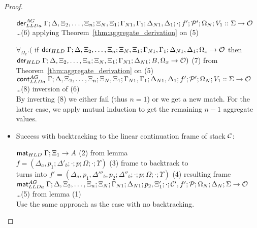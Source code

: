 \begin{proof}
\begin{itemize}[leftmargin=*]
      $\mathsf{der}_{LLDa}^{AG} \; \Gamma; \Delta, \Xi_2, \dotsc, \Xi_n; \Xi_N, \Xi_1; \Gamma_{N1}, \Gamma_1; \Delta_{N1}, \Delta_1;
            \cdot; f'; \mathcal{P'}; \Omega_N; V_1 :: \Sigma \rightarrow \mathcal{O}$
      \\ \dots \hfill (6) applying Theorem~\ref{thm:aggregate_derivation} on (5)

      $\forall_{\Omega_x}. ($ if $\mathsf{der}_{HLD} \; \Gamma; \Delta, \Xi_2, \dotsc, \Xi_n; \Xi_N, \Xi_1;
            \Gamma_{N1}, \Gamma_1; \Delta_{N1}, \Delta_1; \Omega_x \rightarrow
            \mathcal{O}$ then \\ \hspace*{0.5cm} $\mathsf{der}_{HLD} \; \Gamma;
            \Delta, \Xi_2, \dotsc, \Xi_n; \Xi_N, \Xi_1; \Gamma_{N1}; \Delta_{N1}; B, \Omega_x
            \rightarrow \mathcal{O})$ \hfill (7) from
      Theorem~\ref{thm:aggregate_derivation} on (5) \\

      $\mathsf{cont}_{LLDa}^{AG} \; \Gamma; \Delta, \Xi_2, \dotsc, \Xi_n; \Xi_N, \Xi_1; \Gamma_{N1},
         \Gamma_1; \Delta_{N1}, \Delta_1; f'; \mathcal{P'}; \Omega_N; V_1 ::
         \Sigma \rightarrow \mathcal{O}$\\ \dots \hfill (8) inversion of (6) \\
        
        By inverting (8) we either fail (thus $n = 1$) or we get a new match.
        For the latter case, we apply mutual induction to get the remaining $n -
        1$ aggregate values.
      
   \item Success with backtracking to the linear continuation frame of stack $\mathcal{C}$:
      
      $\mathsf{mat}_{HLD} \; \Gamma; \Xi_1 \rightarrow A$ \hfill (2) from lemma \\

      $f = (\Delta_a, p_1; \Delta'_b; \cdot; p; \Omega; \cdot; \Upsilon)$ \hfill (3) frame to backtrack to \\
      turns into $f' = (\Delta_a, p_1, \Delta'''_b, p_2; \Delta''_b; \cdot; p; \Omega; \cdot; \Upsilon)$ \hfill (4) resulting frame \\

      $\mathsf{mat}_{LLDa}^{AG} \; \Gamma; \Delta, \Xi_2, \dotsc, \Xi_n; \Xi_N; \Gamma_{N1};
         \Delta_{N1}; p_2, \Xi'_1; \cdot; \mathcal{C'}, f'; \mathcal{P}; \Omega_N;
         \Delta_N; \Sigma \rightarrow \mathcal{O}$\\ \dots \hfill (5) from lemma (1) \\
      
      Use the same approach as the case with no backtracking.
      

\end{itemize}
\end{proof}
